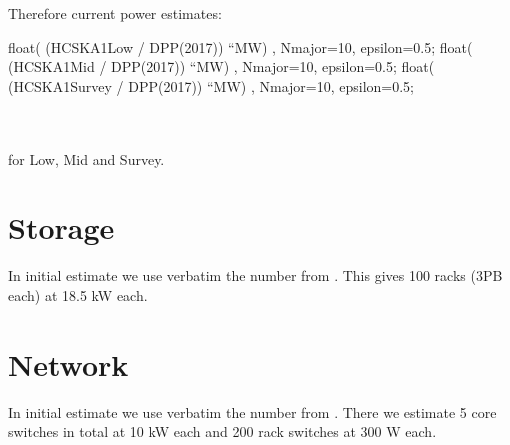 \documentclass[useAMS,usenatbib,referee]{article}
\begin{document}
Therefore current power estimates:
\begin{maxima}[]
float( (HCSKA1Low / DPP(2017)) ``MW) , Nmajor=10, epsilon=0.5;
float( (HCSKA1Mid / DPP(2017)) ``MW) , Nmajor=10, epsilon=0.5;
float( (HCSKA1Survey / DPP(2017)) ``MW) , Nmajor=10, epsilon=0.5;
\maximaoutput*
{}\; \\
\; \\
\; \\
\end{maxima}
for Low, Mid and Survey. 


\section{Storage}

In initial estimate we use verbatim the number from
\cite{SDP-PROP-DR-001-1-ElemConc}. This gives 100 racks (3PB each) at
18.5 kW each.

\section{Network}

In initial estimate we use verbatim the number from
\cite{SDP-PROP-DR-001-1-ElemConc}. There we estimate 5 core switches
in total at  10 kW each and 200 rack switches at 300 W each. 


 

\end{document}
